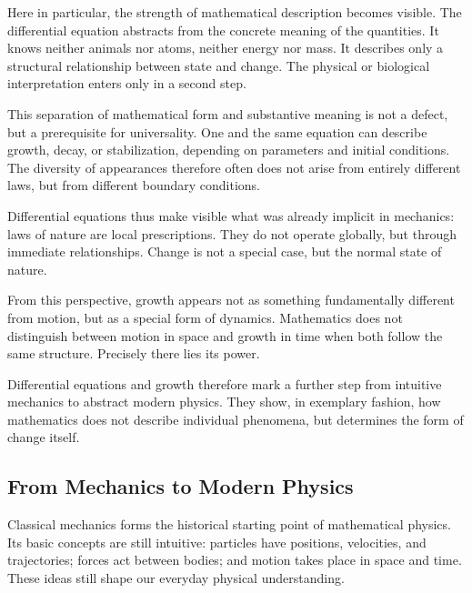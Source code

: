 Here in particular, the strength of mathematical description becomes visible.
The differential equation abstracts
from the concrete meaning of the quantities.
It knows neither animals nor atoms,
neither energy nor mass.
It describes only
a structural relationship between state and change.
The physical or biological interpretation
enters only in a second step.

This separation of mathematical form
and substantive meaning
is not a defect,
but a prerequisite for universality.
One and the same equation can describe growth,
decay, or stabilization,
depending on parameters
and initial conditions.
The diversity of appearances therefore often does not arise
from entirely different laws,
but from different boundary conditions.

Differential equations thus make visible
what was already implicit in mechanics:
laws of nature are local prescriptions.
They do not operate globally,
but through immediate relationships.
Change is not a special case,
but the normal state of nature.

From this perspective, growth appears
not as something fundamentally different from motion,
but as a special form of dynamics.
Mathematics
does not distinguish between motion in space
and growth in time
when both follow the same structure.
Precisely there lies its power.

Differential equations and growth therefore mark
a further step
from intuitive mechanics
to abstract modern physics.
They show, in exemplary fashion,
how mathematics does not describe individual phenomena,
but determines the form of change itself.

\subsection{From Mechanics to Modern Physics}

Classical mechanics forms the historical starting point
of mathematical physics.
Its basic concepts are still intuitive:
particles have positions,
velocities, and trajectories;
forces act between bodies;
and motion takes place in space
and time.
These ideas still shape our everyday physical understanding.

